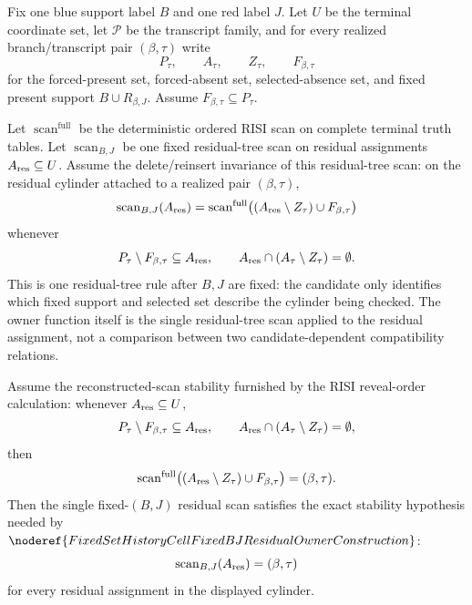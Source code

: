 \begin{helper}
Fix one blue support label \(B\) and one red label \(J\).  Let \(U\) be the
terminal coordinate set, let \(\mathcal P\) be the transcript family, and
for every realized branch/transcript pair \((\beta,\tau)\) write
\[
P_\tau,\qquad A_\tau,\qquad Z_\tau,\qquad F_{\beta,\tau}
\]
for the forced-present set, forced-absent set, selected-absence set, and
fixed present support \(B\cup R_{\beta,J}\).  Assume
\(F_{\beta,\tau}\subseteq P_\tau\).

Let \(\operatorname{scan}^{\mathrm{full}}\) be the deterministic ordered RISI
scan on complete terminal truth tables.  Let
\(\operatorname{scan}_{B,J}\) be one fixed residual-tree scan on residual
assignments \(A_{\rm res}\subseteq U\).  Assume the delete/reinsert
invariance of this residual-tree scan: on the residual cylinder attached to
a realized pair \((\beta,\tau)\),
\[
\operatorname{scan}_{B,J}(A_{\rm res})
 =
\operatorname{scan}^{\mathrm{full}}
  \bigl((A_{\rm res}\setminus Z_\tau)\cup F_{\beta,\tau}\bigr)
\]
whenever
\[
P_\tau\setminus F_{\beta,\tau}\subseteq A_{\rm res},\qquad
A_{\rm res}\cap(A_\tau\setminus Z_\tau)=\emptyset .
\]
This is one residual-tree rule after \(B,J\) are fixed: the candidate only
identifies which fixed support and selected set describe the cylinder being
checked.  The owner function itself is the single residual-tree scan applied
to the residual assignment, not a comparison between two candidate-dependent
compatibility relations.

Assume the reconstructed-scan stability furnished by the RISI reveal-order
calculation: whenever \(A_{\rm res}\subseteq U\),
\[
P_\tau\setminus F_{\beta,\tau}\subseteq A_{\rm res},\qquad
A_{\rm res}\cap(A_\tau\setminus Z_\tau)=\emptyset ,
\]
then
\[
\operatorname{scan}^{\mathrm{full}}
  \bigl((A_{\rm res}\setminus Z_\tau)\cup F_{\beta,\tau}\bigr)
  =(\beta,\tau).
\]
Then the single fixed-\((B,J)\) residual scan satisfies the exact stability
hypothesis needed by
\(\noderef{FixedSetHistoryCellFixedBJResidualOwnerConstruction}\):
\[
\operatorname{scan}_{B,J}(A_{\rm res})=(\beta,\tau)
\]
for every residual assignment in the displayed cylinder.
\end{helper}
